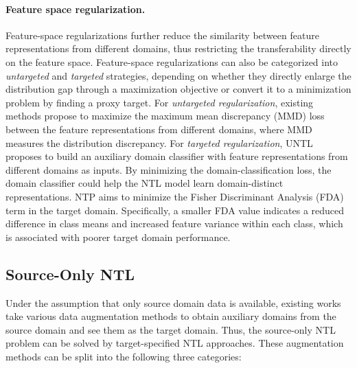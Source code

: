 \paragraph{Feature space regularization.} Feature-space regularizations further reduce the similarity between feature representations from different domains, thus restricting the transferability directly on the feature space. Feature-space regularizations can also be categorized into \textit{untargeted} and \textit{targeted} strategies, depending on whether they directly enlarge the distribution gap through a maximization objective or convert it to a minimization problem by finding a proxy target. For \textit{untargeted regularization}, existing methods \cite{wang2021non,zeng2022unsupervised} propose to maximize the maximum mean discrepancy (MMD) loss between the feature representations from different domains, where MMD measures the distribution discrepancy. 
For \textit{targeted regularization}, UNTL \cite{zeng2022unsupervised} proposes to build an auxiliary domain classifier with feature representations from different domains as inputs. By minimizing the domain-classification loss, the domain classifier could help the NTL model learn domain-distinct representations. 
NTP \cite{ding2024non} aims to minimize the Fisher Discriminant Analysis (FDA) term \cite{shao2022not} in the target domain. Specifically, a smaller FDA value indicates a reduced difference in class means and increased feature variance within each class, which is associated with poorer target domain performance.



\subsection{Source-Only NTL}
\label{sec:source-only}

Under the assumption that only source domain data is available, existing works~\cite{wang2021non,wang2023model,wang2023domain,hong2024improving} take various data augmentation methods to obtain auxiliary domains from the source domain and see them as the target domain. 
Thus, the source-only NTL problem can be solved by target-specified NTL approaches. 
These augmentation methods can be split into the following three categories: 



